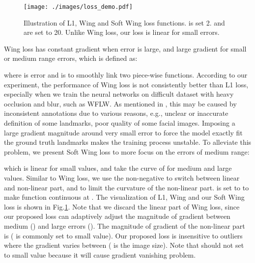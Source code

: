 \documentclass[runningheads]{llncs}
\begin{document}
\begin{figure}[t]
	\centering
	\texttt{[image: ./images/loss\_demo.pdf]}
	\caption{Illustration of L1, Wing and Soft Wing loss functions.  is set 2.  and  are set to 20. Unlike Wing loss, our loss is linear for small errors.}
	\label{fig:loss_demo}
\end{figure}

Wing loss\cite{wing} has constant gradient when error is large, and large gradient for small or medium range errors, which is defined as:

where  is error and  is  to smoothly link two piece-wise functions. 
According to our experiment, the performance of Wing loss is not consistently better than L1 loss, especially when we train the neural networks on difficult dataset with heavy occlusion and blur, such as WFLW.
As mentioned in \cite{SemAlign}, this may be caused by inconsistent annotations due to various reasons, e.g., unclear or inaccurate definition of some landmarks, poor quality of some facial images.
Imposing a large gradient magnitude around very small error to force the model exactly fit the ground truth landmarks makes the training process unstable. 
To alleviate this problem, we present Soft Wing loss to more focus on the errors of medium range:

which is linear for small values, and take the curve of  for medium and large values. Similar to Wing loss, we use the non-negative  to switch between linear and non-linear part, and  to limit the curvature of the non-linear part.  is set to  to make function continuous at . The visualization of L1, Wing and our Soft Wing loss is shown in Fig.\ref{fig:loss_demo}. 
Note that we discard the linear part of Wing loss, since our proposed loss can adaptively adjust the magnitude of gradient between medium () and large errors (). The magnitude of gradient of the non-linear part is  ( is commonly set to small value). Our proposed loss is insensitive to outliers where the gradient varies between  ( is the image size). Note that  should not set to small value because it will cause gradient vanishing problem.
\end{document}

